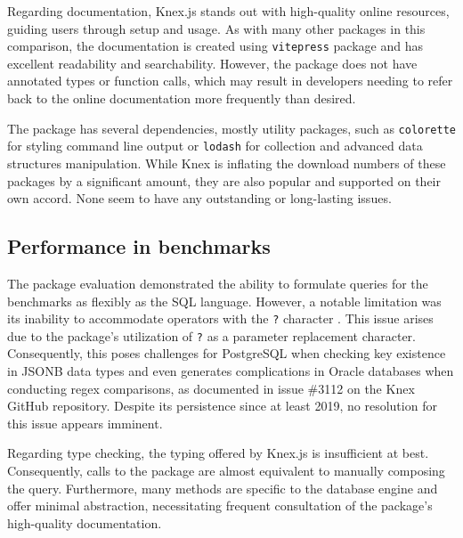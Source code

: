 Regarding documentation, Knex.js stands out with high-quality online resources,
guiding users through setup and usage. As with many other packages in this
comparison, the documentation is created using \texttt{vitepress} package and
has excellent readability and searchability. However, the package does not have
annotated types or function calls, which may result in developers needing to
refer back to the online documentation more frequently than desired.

The package has several dependencies, mostly utility packages, such as
\texttt{colorette} for styling command line output or \texttt{lodash} for
collection and advanced data structures manipulation. While Knex is inflating
the download numbers of these packages by a significant amount, they are also
popular and supported on their own accord. None seem to have any outstanding or
long-lasting issues.

\subsection*{Performance in benchmarks}

The package evaluation demonstrated the ability to formulate queries for the
benchmarks as flexibly as the SQL language. However, a notable limitation was
its inability to accommodate operators with the \texttt{?} character
\cite{knexJSONIssue1}. This issue arises due to the package's utilization of
\texttt{?} as a parameter replacement character. Consequently, this poses
challenges for PostgreSQL when checking key existence in JSONB data types and
even generates complications in Oracle databases when conducting regex
comparisons, as documented in issue \#3112 \cite{knexJSONIssue2} on the Knex
GitHub repository. Despite its persistence since at least 2019, no resolution
for this issue appears imminent.

Regarding type checking, the typing offered by Knex.js is insufficient at best.
Consequently, calls to the package are almost equivalent to manually composing
the query. Furthermore, many methods are specific to the database engine and
offer minimal abstraction, necessitating frequent consultation of the package's
high-quality documentation.
